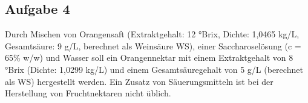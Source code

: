 \documentclass[a4paper,11pt]{article}
\newif\ifshowme
\begin{document}
%
%
%

\ifshowme
\antwort{
\begin{align*}
J &= P \cdot A \cdot \frac{\Delta p}{l}
\end{align*}

\pp 
\textbf{Sauerstoff:}
\begin{align*}
J &= P \cdot A \cdot \frac{\Delta p}{l} \\
 &= \frac{628 \cdot 10^{-6}~\text{m}^3 \cdot 10^{-4} ~\text{m}}{~\text{m}^2 \cdot ~\text{d} \cdot ~\text{bar}} \cdot \pi  \left( 1,25 \cdot 10^{-5}~\text{m} \right)^2  \cdot \frac{0,21 ~\text{bar}}{4 \cdot 10^{-5} ~\text{m}} \\
  &= 1,62 \cdot 10^{-13} ~\text{m}^3 / ~\text{d}
\end{align*}
\pp 
\textbf{Wasser:}
\begin{align*}
J &= P \cdot A \cdot \frac{\Delta p}{l} \\
 &= \frac{16,72 ~\text{g}  \cdot 10^{-4} ~\text{m}}{~\text{m}^2 \cdot ~\text{d} \cdot ~\text{bar}} \cdot \pi  \left( 1,25 \cdot 10^{-5}~\text{m} \right)^2  \cdot \frac{14,07 \cdot 10^{-3} ~\text{bar}}{4 \cdot 10^{-5} ~\text{m}} \\
  &= 2,88 \cdot 10^{-10} ~\text{g} / ~\text{d}
\end{align*}

}
\pagebreak
\else
\fi



\subsection*{Aufgabe 4}
Durch Mischen von Orangensaft (Extraktgehalt: 12 °Brix, Dichte: 1,0465 kg/L, Gesamtsäure: 9
g/L, berechnet als Weinsäure WS), einer Saccharoselösung (c = 65\% w/w) und Wasser soll ein
Orangennektar mit einem Extraktgehalt von 8 °Brix (Dichte: 1,0299 kg/L) und einem
Gesamtsäuregehalt von 5 g/L (berechnet als WS) hergestellt werden. Ein Zusatz von
Säuerungsmitteln ist bei der Herstellung von Fruchtnektaren nicht üblich.
\end{document}

